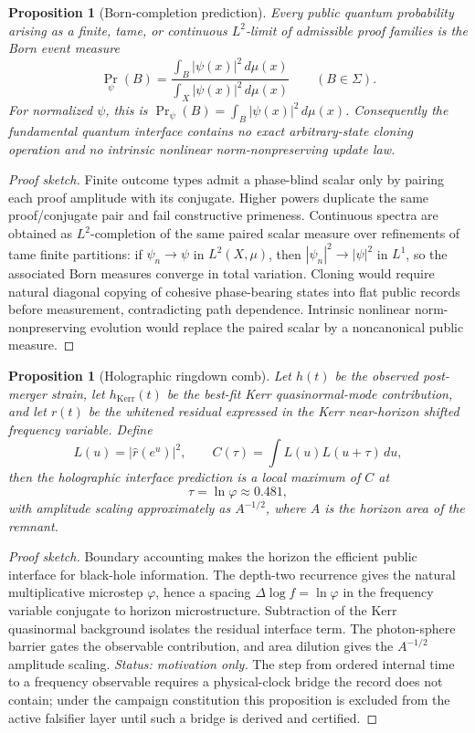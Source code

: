 \documentclass[11pt]{article}
\theoremstyle{plain}
\newtheorem{proposition}[theorem]{Proposition}
\theoremstyle{definition}
\theoremstyle{remark}
\newenvironment{proofsketch}{\begin{proof}[Proof sketch]}{\end{proof}}
\begin{document}
\begin{proposition}[Born-completion prediction]
Every public quantum probability arising as a finite, tame, or continuous
\(L^2\)-limit of admissible proof families is the Born event measure
\[
\Pr_\psi(B)
=
\frac{\int_B|\psi(x)|^2\,d\mu(x)}
{\int_X|\psi(x)|^2\,d\mu(x)}
\qquad (B\in\Sigma).
\]
For normalized \(\psi\), this is \(\Pr_\psi(B)=\int_B|\psi(x)|^2\,d\mu(x)\).
Consequently the fundamental quantum interface contains no exact arbitrary-state cloning operation and no intrinsic nonlinear norm-nonpreserving update law.
\end{proposition}

\begin{proofsketch}
Finite outcome types admit a phase-blind scalar only by pairing each proof amplitude with its conjugate. Higher powers duplicate the same proof/conjugate pair and fail constructive primeness. Continuous spectra are obtained as \(L^2\)-completion of the same paired scalar measure over refinements of tame finite partitions: if \(\psi_n\to\psi\) in \(L^2(X,\mu)\), then \(|\psi_n|^2\to|\psi|^2\) in \(L^1\), so the associated Born measures converge in total variation. Cloning would require natural diagonal copying of cohesive phase-bearing states into flat public records before measurement, contradicting path dependence. Intrinsic nonlinear norm-nonpreserving evolution would replace the paired scalar by a noncanonical public measure.
\end{proofsketch}

\begin{proposition}[Holographic ringdown comb]
Let \(h(t)\) be the observed post-merger strain, let \(h_{\mathrm{Kerr}}(t)\) be the best-fit Kerr quasinormal-mode contribution, and let \(r(t)\) be the whitened residual expressed in the Kerr near-horizon shifted frequency variable. Define
\[
L(u)=|\widehat r(e^u)|^2,
\qquad
C(\tau)=\int L(u)L(u+\tau)\,du,
\]
then the holographic interface prediction is a local maximum of \(C\) at
\[
\tau=\ln\varphi \approx 0.481,
\]
with amplitude scaling approximately as \(A^{-1/2}\), where \(A\) is the horizon area of the remnant.
\end{proposition}

\begin{proofsketch}
Boundary accounting makes the horizon the efficient public interface for black-hole information. The depth-two recurrence gives the natural multiplicative microstep \(\varphi\), hence a spacing \(\Delta\log f=\ln\varphi\) in the frequency variable conjugate to horizon microstructure. Subtraction of the Kerr quasinormal background isolates the residual interface term. The photon-sphere barrier gates the observable contribution, and area dilution gives the \(A^{-1/2}\) amplitude scaling. \emph{Status: motivation only.} The step from ordered internal time to a frequency observable requires a physical-clock bridge the record does not contain; under the campaign constitution this proposition is excluded from the active falsifier layer until such a bridge is derived and certified.
\end{proofsketch}
\end{document}
